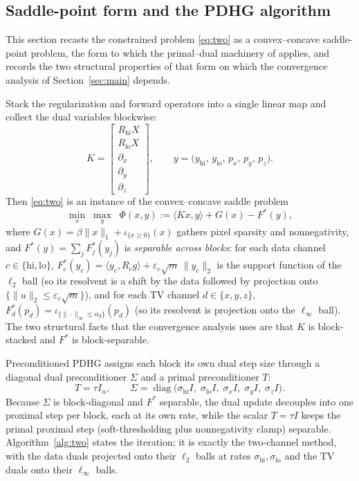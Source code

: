 \documentclass{article}
\newcommand{\diag}{\operatorname{diag}}
\begin{document}
\subsection{Saddle-point form and the PDHG algorithm}

This section recasts the constrained problem \eqref{eq:two} as a convex--concave saddle-point problem, the form to which the primal--dual machinery of \citet{chambolle2011first} applies, and records the two structural properties of that form on which the convergence analysis of Section~\ref{sec:main} depends.

Stack the regularization and forward operators into a single linear map and collect the dual variables blockwise:
\begin{equation}
\label{eq:K}
K=\begin{bmatrix} R_{\mathrm{hi}}X\\ R_{\mathrm{lo}}X\\ \partial_x\\ \partial_y\\ \partial_z\end{bmatrix},
\qquad
y=\big(y_{\mathrm{hi}},\,y_{\mathrm{lo}},\,p_x,\,p_y,\,p_z\big).
\end{equation}
Then \eqref{eq:two} is an instance of the convex--concave saddle problem
\begin{equation}
\label{eq:saddle}
\min_{x}\;\max_{y}\;\; \Phi(x,y):=\langle Kx,y\rangle+G(x)-F^\ast(y),
\end{equation}
where $G(x)=\beta\|x\|_1+\iota_{\{x\ge0\}}(x)$ gathers pixel sparsity and nonnegativity, and $F^\ast(y)=\sum_j F_j^\ast(y_j)$ is \emph{separable across blocks}: for each data channel $c\in\{\mathrm{hi},\mathrm{lo}\}$, $F_c^\ast(y_c)=\langle y_c,R_c g\rangle+\varepsilon_c\sqrt{m}\,\|y_c\|_2$ is the support function of the $\ell_2$ ball (so its resolvent is a shift by the data followed by projection onto $\{\|u\|_2\le\varepsilon_c\sqrt m\}$), and for each TV channel $d\in\{x,y,z\}$, $F_d^\ast(p_d)=\iota_{\{\|\cdot\|_\infty\le\alpha_d\}}(p_d)$ (so its resolvent is projection onto the $\ell_\infty$ ball). The two structural facts that the convergence analysis uses are that $K$ is block-stacked and $F^\ast$ is block-separable.

Preconditioned PDHG assigns each block its own dual step size through a diagonal dual preconditioner $\Sigma$ and a primal preconditioner $T$:
\begin{equation}
\label{eq:precond-def}
T=\tau I_n,\qquad
\Sigma=\diag\!\big(\sigma_{\mathrm{hi}}I,\;\sigma_{\mathrm{lo}}I,\;\sigma_x I,\;\sigma_y I,\;\sigma_z I\big).
\end{equation}
Because $\Sigma$ is block-diagonal and $F^\ast$ separable, the dual update decouples into one proximal step per block, each at its own rate, while the scalar $T=\tau I$ keeps the primal proximal step (soft-thresholding plus nonnegativity clamp) separable. Algorithm~\ref{alg:two} states the iteration; it is exactly the two-channel method, with the data duals projected onto their $\ell_2$ balls at rates $\sigma_{\mathrm{hi}},\sigma_{\mathrm{lo}}$ and the TV duals onto their $\ell_\infty$ balls.
\end{document}
